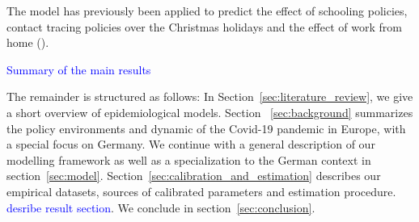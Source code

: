 The model has previously been applied to predict the effect of schooling policies, contact tracing policies over the Christmas holidays and the effect of work from home (\citet{Dorn2020a, Gabler2020, Gabler2021}).


\textcolor{blue}{Summary of the main results}


The remainder is structured as follows: In Section~\ref{sec:literature_review}, we give a short overview of epidemiological models. Section ~\ref{sec:background} summarizes the policy environments and dynamic of the Covid-19 pandemic in Europe, with a special focus on Germany. We continue with a general description of our modelling framework  as well as a specialization to the German context in section~\ref{sec:model}. Section~\ref{sec:calibration_and_estimation} describes our empirical datasets, sources of calibrated parameters and estimation procedure. \textcolor{blue}{desribe result section}. We conclude in section~\ref{sec:conclusion}.
